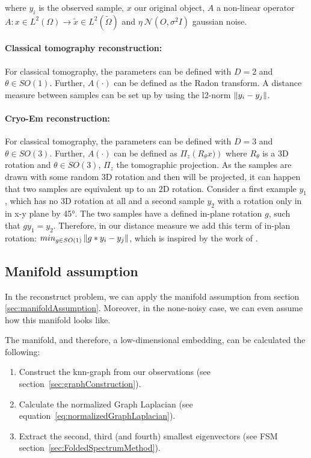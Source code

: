 where $y_i$ is the observed sample, $x$ our original object, $A$ a non-linear operator 
$A: x \in L^2(\Omega) \rightarrow \tilde{x} \in L^2(\tilde{\Omega})$ and $\eta ~ \mathcal{N}(O, \sigma^2 I)$ gaussian noise.

\paragraph{Classical tomography reconstruction:}

For classical tomography, the parameters can be defined with $D=2$ and $\theta \in SO(1)$.
Further, $A(\cdot)$ can be defined as the Radon transform. 
A distance measure between samples can be set up by using the l2-norm $\left\lVert y_i - y_j\right\rVert$.

\paragraph{Cryo-Em reconstruction:}
For classical tomography, the parameters can be defined with $D=3$ and $\theta \in SO(3)$.
Further, $A(\cdot)$ can be defined as $\Pi_z \left( R_{\theta} x) \right)$ 
where $R_{\theta}$ is a 3D rotation and $\theta \in SO(3)$, $\Pi_z$ the tomographic projection.
As the samples are drawn with some random 3D rotation and then will be projected, it can 
happen that two samples are equivalent up to an 2D rotation. 
Consider a first example $y_1$, which has no 3D rotation at all and 
a second sample $y_2$ with a rotation only in in x-y plane by 45°.
The two samples have a defined in-plane rotation $g$, such that $g y_1 = y_2$.
Therefore, in our distance measure we add this term of in-plan rotation: $min_{g \in SO(1)}\left\lVert g * y_i - y_j\right\rVert$, 
which is inspired by the work of \cite{multiDiffusionMaps}. 


\subsection{Manifold assumption}
In the reconstruct problem, we can apply the manifold assumption from section \ref{sec:manifoldAssumption}.
Moreover, in the none-noisy case, we can even assume how this manifold looks like.

The manifold, and therefore, a low-dimensional embedding, can be calculated the following:

\begin{enumerate}
    \item Construct the knn-graph from our observations (see section~\ref{sec:graphConstruction}).
    \item Calculate the normalized Graph Laplacian (see equation~\ref{eq:normalizedGraphLaplacian}).
    \item Extract the second, third (and fourth) smallest eigenvectors (see FSM section~\ref{sec:FoldedSpectrumMethod}).
\end{enumerate}

